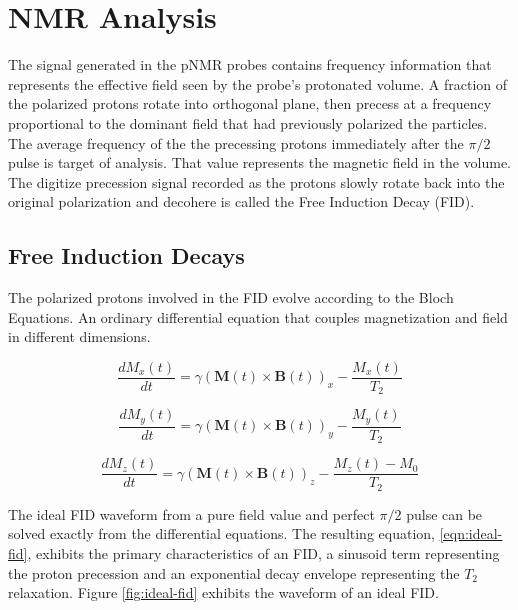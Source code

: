 \section{NMR Analysis}

The signal generated in the pNMR probes contains frequency information that represents the effective field seen by the probe's protonated  volume.  A fraction of the polarized protons rotate into orthogonal plane, then precess at a frequency proportional to the dominant field that had previously polarized the particles.  The average frequency of the the precessing protons immediately after the $\pi/2$ pulse is target of analysis.  That value represents the magnetic field in the volume.  The digitize precession signal recorded as the protons slowly rotate back into the original polarization and decohere is called the Free Induction Decay (FID).


\subsection{Free Induction Decays}

The polarized protons involved in the FID evolve according to the Bloch Equations.  An ordinary differential equation that couples magnetization and field in different dimensions.

\begin{equation}
\frac{dM_x(t)}{dt} = 
\gamma (\mathbf{M}(t) \times \mathbf{B}(t))_x - \frac{M_x(t)}{T_2}
\label{eqn:bloch-x}
\end{equation}

\begin{equation}
\frac{dM_y(t)}{dt} = 
\gamma (\mathbf{M}(t)\times \mathbf{B}(t))_y - \frac{M_y(t)}{T_2}
\label{eqn:bloch-y}
\end{equation}

\begin{equation}
\frac{dM_z(t)}{dt} = 
\gamma (\mathbf{M}(t) \times \mathbf{B}(t))_z - \frac{M_z(t) - M_0}{T_2}
\label{eqn:bloch-z}
\end{equation}

The ideal FID waveform from a pure field value and perfect $\pi/2$ pulse can be solved exactly from the differential equations.  The resulting equation, \ref{eqn:ideal-fid}, exhibits the primary characteristics of an FID, a sinusoid term representing the proton precession and an exponential decay envelope representing the $T_2$ relaxation.  Figure \ref{fig:ideal-fid} exhibits the waveform of an ideal FID.


